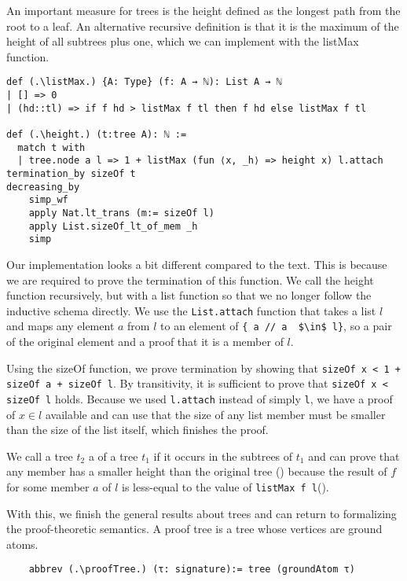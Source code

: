 An important measure for trees is the height defined as the longest path from the root to a leaf. An alternative recursive definition is that it is the maximum of the height of all subtrees plus one, which we can implement with the listMax function.

\begin{lstlisting}
def (.\listMax.) {A: Type} (f: A → ℕ): List A → ℕ
| [] => 0
| (hd::tl) => if f hd > listMax f tl then f hd else listMax f tl

def (.\height.) (t:tree A): ℕ :=
  match t with
  | tree.node a l => 1 + listMax (fun ⟨x, _h⟩ => height x) l.attach
termination_by sizeOf t
decreasing_by
    simp_wf
    apply Nat.lt_trans (m:= sizeOf l)
    apply List.sizeOf_lt_of_mem _h
    simp
\end{lstlisting}

Our implementation looks a bit different compared to the text. This is because we are required to prove the termination of this function. We call the height function recursively, but with a list function so that we no longer follow the inductive schema directly. We use the \lstinline|List.attach| function that takes a list $l$ and maps any element $a$ from $l$ to an element of \lstinline|{ a // a  $\in$ l}|, so a pair of the original element and a proof that it is a member of $l$.

Using the sizeOf function, we prove termination by showing that \lstinline|sizeOf x < 1 + sizeOf a + sizeOf l|. By transitivity, it is sufficient to prove that \lstinline|sizeOf x < sizeOf l| holds. Because we used \lstinline|l.attach| instead of simply \lstinline|l|, we have a proof of $x \in l$ available and can use that the size of any list member must be smaller than the size of the list itself, which finishes the proof. 

We call a tree $t_2$ a \member of a tree $t_1$ if it occurs in the subtrees of $t_1$ and can prove that any member has a smaller height than the original tree (\heightOfMemberIsSmaller) because the result of $f$ for some member $a$ of $l$ is less-equal to the value of \lstinline|listMax f l|(\listMaxlefmember).

With this, we finish the general results about trees and can return to formalizing the proof-theoretic semantics. A proof tree is a tree whose vertices are ground atoms.

\begin{lstlisting}
    abbrev (.\proofTree.) (τ: signature):= tree (groundAtom τ)
\end{lstlisting}

